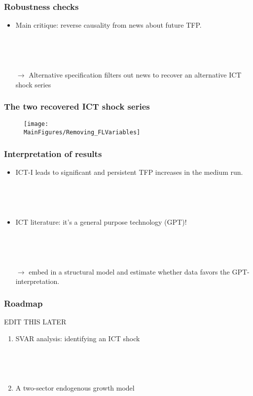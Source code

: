 \documentclass{beamer}
\def \MainFigures{../Draft_Summer2018/MainFigures}
\begin{document}
\begin{frame}
	\frametitle{Robustness checks}
	\label{robustness_checks}
	
\begin{itemize}
\item Main critique: reverse causality from news about future TFP.

\

\

\item[$\rightarrow$] Alternative specification filters out news to recover an alternative ICT shock series 

\hyperlink{controlling_news}{}	
\end{itemize}

\end{frame}

\begin{frame}
	\frametitle{The two recovered ICT shock series}
	
\begin{figure}[h!]
\texttt{[image: \\MainFigures/Removing\_FLVariables]}
\end{figure}	

\end{frame}

\begin{frame}
	\frametitle{Interpretation of results}
	
	\begin{itemize}
	\item ICT-I leads to significant and persistent TFP increases in the medium run.
	
	\
	
	\
	
	\item ICT literature: it's a general purpose technology (GPT)!
	
	\
	
	\
	
	\item[$\rightarrow$] embed in a structural model and estimate whether data favors the GPT-interpretation.
	\end{itemize}

	
	
	
	

\end{frame}

\begin{frame}
\frametitle{Roadmap}

EDIT THIS LATER
\begin{enumerate} 
	\item SVAR analysis: identifying an ICT shock
	
	\
	
	\
	
	\item A two-sector endogenous growth model
	 
	\
	
\end{enumerate} 

\end{frame}
\end{document}
